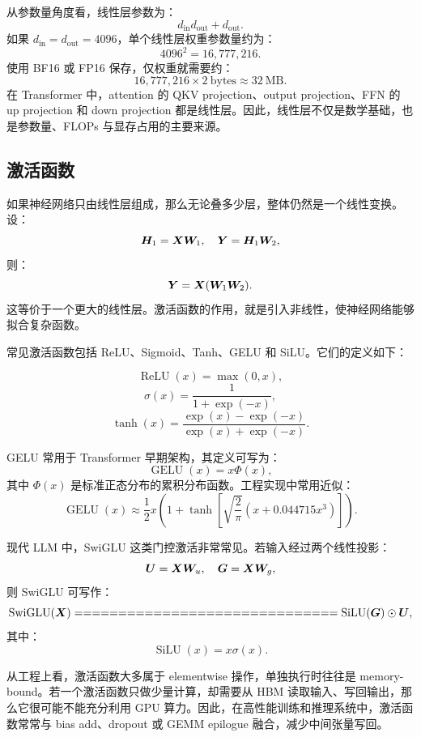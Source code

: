 从参数量角度看，线性层参数为：
\[
d_{\mathrm{in}}d_{\mathrm{out}}+d_{\mathrm{out}}.
\]
如果 $d_{\mathrm{in}}=d_{\mathrm{out}}=4096$，单个线性层权重参数量约为：
\[
4096^2=16,777,216.
\]
使用 BF16 或 FP16 保存，仅权重就需要约：
\[
16,777,216\times 2\ \mathrm{bytes}\approx 32\ \mathrm{MB}.
\]
在 Transformer 中，attention 的 QKV projection、output projection、FFN 的 up projection 和 down projection 都是线性层。因此，线性层不仅是数学基础，也是参数量、FLOPs 与显存占用的主要来源。

\subsection{激活函数}
\label{subsec:activation-functions}

如果神经网络只由线性层组成，那么无论叠多少层，整体仍然是一个线性变换。设：
\[
\bm{H}_1=\bm{X}\bm{W}_1,\quad
\bm{Y}=\bm{H}_1\bm{W}_2,
\]
则：
\[
\bm{Y}=\bm{X}(\bm{W}_1\bm{W}_2).
\]
这等价于一个更大的线性层。激活函数的作用，就是引入非线性，使神经网络能够拟合复杂函数。

常见激活函数包括 ReLU、Sigmoid、Tanh、GELU 和 SiLU。它们的定义如下：

\[
\operatorname{ReLU}(x)=\max(0,x),
\]
\[
\sigma(x)=\frac{1}{1+\exp(-x)},
\]
\[
\tanh(x)=\frac{\exp(x)-\exp(-x)}{\exp(x)+\exp(-x)}.
\]

GELU 常用于 Transformer 早期架构，其定义可写为：
\[
\operatorname{GELU}(x)=x\Phi(x),
\]
其中 $\Phi(x)$ 是标准正态分布的累积分布函数。工程实现中常用近似：
\[
\operatorname{GELU}(x)
\approx
\frac{1}{2}x
\left(
1+\tanh
\left[
\sqrt{\frac{2}{\pi}}
\left(x+0.044715x^3\right)
\right]
\right).
\]

现代 LLM 中，SwiGLU 这类门控激活非常常见。若输入经过两个线性投影：
\[
\bm{U}=\bm{X}\bm{W}_u,\quad
\bm{G}=\bm{X}\bm{W}_g,
\]
则 SwiGLU 可写作：
\[
\operatorname{SwiGLU}(\mat{X})
==============================

\operatorname{SiLU}(\mat{G})\odot \mat{U},
\]
其中：
\[
\operatorname{SiLU}(x)=x\sigma(x).
\]

从工程上看，激活函数大多属于 elementwise 操作，单独执行时往往是 memory-bound。若一个激活函数只做少量计算，却需要从 HBM 读取输入、写回输出，那么它很可能不能充分利用 GPU 算力。因此，在高性能训练和推理系统中，激活函数常常与 bias add、dropout 或 GEMM epilogue 融合，减少中间张量写回。

